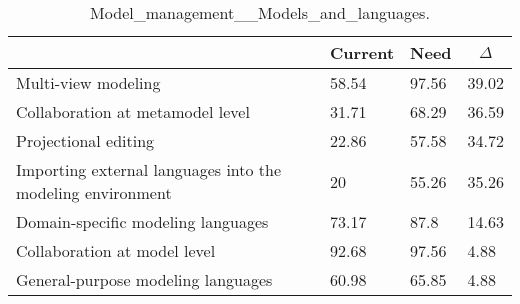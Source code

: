 
  \begin{table*}[]
  \centering
  \notsotiny
  \caption{ Model_management__Models_and_languages.}
\label{tab:model_management__models_and_languages}
\begin{tabular}{|l|l|l|l|}
  \hline
  \rowcolor[HTML]{C0C0C0}
    \multicolumn{1}{|c|}{Feature} & \multicolumn{1}{c|}{Current} & \multicolumn{1}{c|}{Need} & \multicolumn{1}{c|}{$\Delta$} \\ \hline
  Multi-view modeling & 58.54 & 97.56 & 39.02 \\ \hline 
Collaboration at metamodel level & 31.71 & 68.29 & 36.59 \\ \hline 
Projectional editing & 22.86 & 57.58 & 34.72 \\ \hline 
Importing external languages into the modeling environment & 20 & 55.26 & 35.26 \\ \hline 
Domain-specific modeling languages & 73.17 & 87.8 & 14.63 \\ \hline 
Collaboration at model level & 92.68 & 97.56 & 4.88 \\ \hline 
General-purpose modeling languages & 60.98 & 65.85 & 4.88 \\ \hline 
\end{tabular}%
  \end{table*}